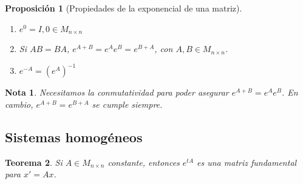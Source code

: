 \documentclass[11pt, a4paper,twoside]{article}
\theoremstyle{theorem-style}  %
\newtheorem{theorem}{Teorema}[section]  %
\newtheorem{proposition}[theorem]{Proposición}
\theoremstyle{definition-style}
\newtheorem*{note}{Nota} %
\theoremstyle{example-style}
\begin{document}
\begin{proposition}[Propiedades de la exponencial de una matriz] \ 
	\begin{enumerate}[\quad i)]
		\item $ e^0 =I, 0 \in M_{n\times n}$
		\item Si $ AB=BA $, $ e^{A+B}=e^Ae^B=e^{B+A} $, con $ A,B\in M_{n\times n} $. 
		\item $ e^{-A}=(e^A)^{-1} $
	\end{enumerate}
\end{proposition}
\begin{note}
	Necesitamos la conmutatividad para poder asegurar  $ e^{A+B}=e^Ae^B$. En cambio, $ e^{A+B}=e^{B+A} $ se cumple siempre.
\end{note}
\subsection{Sistemas homogéneos}
\begin{theorem}
	Si $ A\in M_{n\times n} $ constante, entonces $ e^{tA} $ es una matriz fundamental para $ x'=Ax $.
\end{theorem}
\end{document}
